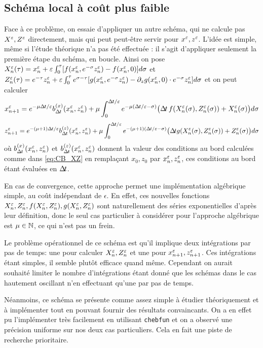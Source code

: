 \subsection{Schéma local à coût plus faible}

Face à ce problème, on essaie d'appliquer un autre schéma, qui ne calcule pas $X^{\varepsilon},Z^{\varepsilon}$ directement, mais qui peut peut-être servir pour $x^{\varepsilon},z^{\varepsilon}$. 
L'idée est simple, même si l'étude théorique n'a pas été effectuée : il s'agit d'appliquer seulement la première étape du schéma, en boucle. Ainsi on pose 
$X_n^{\varepsilon}(\tau) = x_n^{\varepsilon} + \varepsilon\int_0^{\tau} [f(x_n^{\varepsilon},e^{-\sigma}z_n^{\varepsilon}) - f(x_n^{\varepsilon},0)]d\sigma$ et $Z_n^{\varepsilon}(\tau) = e^{-\tau}z_n^{\varepsilon} + \varepsilon\int_0^{\tau} e^{\sigma-\tau} [g(x_n^{\varepsilon},e^{-\sigma}z_n^{\varepsilon}) - \partial_{z} g(x_n^{\varepsilon},0)\cdot e^{-\sigma}z_n^{\varepsilon}]d\sigma$ et on peut calculer 
$$ x_{n+1}\eeps = e^{-\mu\dt/\epsilon} b_{\dt}^{(x)}(x_n\eeps,z_n\eeps) + \mu\int_0^{\dt/\epsilon} e^{-\mu(\dt/\epsilon - \sigma)} \big(\dt\, f(X_n\eeps(\sigma),Z_n\eeps(\sigma))+X_n\eeps(\sigma)\big) d\sigma $$
$$ z_{n+1}\eeps = e^{-(\mu+1)\dt/\epsilon} b_{\dt}^{(z)}(x_n\eeps,z_n\eeps) + \mu\int_0^{\dt/\epsilon} e^{-(\mu+1)(\dt/\epsilon-\sigma)} \big(\dt g(X_n\eeps(\sigma),Z_n\eeps(\sigma))+Z_n\eeps(\sigma)\big) d\sigma $$
où $b_{\Delta\!\!\!\ t}^{(x)}(x_n^{\varepsilon},z_n^{\varepsilon})$ et $b_{\Delta\!\!\!\ t}^{(z)}(x_n^{\varepsilon},z_n^{\varepsilon})$ donnent la valeur des conditions au bord calculées comme dans \eqref{eq:CB_XZ} en remplaçant $x_0,z_0$ par $x_n^{\varepsilon},z_n^{\varepsilon}$, ces conditions au bord étant évaluées en $\Delta\!\!\!\ t$. 

En cas de convergence, cette approche permet une implémentation algébrique simple, au coût indépendant de $\epsilon$. 
En effet, ces nouvelles fonctions $X_n^{\varepsilon},Z_n^{\varepsilon},f(X_n^{\varepsilon},Z_n^{\varepsilon}),g(X_n^{\varepsilon},Z_n^{\varepsilon})$ sont naturellement des séries exponentielles d'après leur définition, donc le seul cas particulier à considérer pour l'approche algébrique est $\mu\in\mathbb{N}$, ce qui n'est pas un frein. 

Le problème opérationnel de ce schéma est qu'il implique deux intégrations par pas de temps: une pour calculer $X_n^{\varepsilon},Z_n^{\varepsilon}$ et une pour $x_{n+1}^{\varepsilon},z_{n+1}^{\varepsilon}$. 
Ces intégrations étant simples, il semble plutôt efficace quand même. 
Cependant on aurait souhaité limiter le nombre d'intégrations étant donné que les schémas dans le cas hautement oscillant n'en effectuant qu'une par pas de temps. 

Néanmoins, ce schéma se présente comme assez simple à étudier théoriquement et à implémenter tout en pouvant fournir des résultats convaincants.
On a en effet pu l'implémenter très facilement en utilisant \texttt{chebfun} et on a observé une précision uniforme sur nos deux cas particuliers. 
Cela en fait une piste de recherche prioritaire. 

